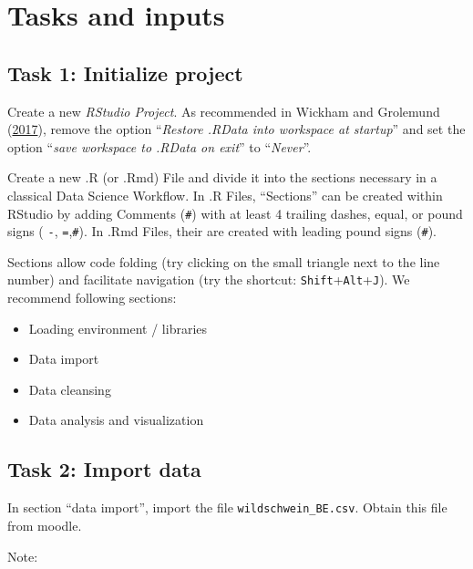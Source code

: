 \documentclass[]{book}
\providecommand{\tightlist}{%
  \setlength{\itemsep}{0pt}\setlength{\parskip}{0pt}}
\begin{document}
\section{Tasks and inputs}\label{tasks-and-inputs}

\subsection{Task 1: Initialize project}\label{task-1-initialize-project}

Create a new \emph{RStudio Project}. As recommended in Wickham and
Grolemund (\protect\hyperlink{ref-wickham2017}{2017}), remove the option
``\emph{Restore .RData into workspace at startup}'' and set the option
``\emph{save workspace to .RData on exit}'' to ``\emph{Never}''.

Create a new .R (or .Rmd) File and divide it into the sections necessary
in a classical Data Science Workflow. In .R Files, ``Sections'' can be
created within RStudio by adding Comments (\texttt{\#}) with at least 4
trailing dashes, equal, or pound signs ( \texttt{-},
\texttt{=},\texttt{\#}). In .Rmd Files, their are created with leading
pound signs (\texttt{\#}).

Sections allow code folding (try clicking on the small triangle next to
the line number) and facilitate navigation (try the shortcut:
\texttt{Shift}+\texttt{Alt}+\texttt{J}). We recommend following
sections:

\begin{itemize}
\tightlist
\item
  Loading environment / libraries
\item
  Data import
\item
  Data cleansing
\item
  Data analysis and visualization
\end{itemize}

\subsection{Task 2: Import data}\label{task-2-import-data}

In section ``data import'', import the file
\texttt{wildschwein\_BE.csv}. Obtain this file from moodle.

Note:
\end{document}
